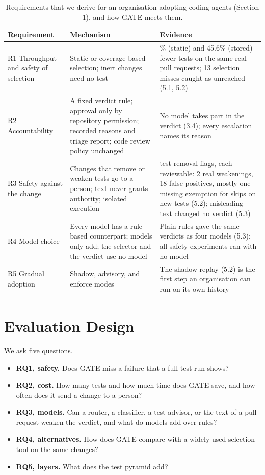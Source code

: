 \documentclass[conference]{IEEEtran}
\providecommand{\tightlist}{\setlength{\itemsep}{0pt}\setlength{\parskip}{0pt}}
\begin{document}
\begin{table}[t]
\caption{Requirements that we derive for an organisation adopting coding agents (Section 1), and how GATE meets them.}
\centering\scriptsize
\begin{tabularx}{\textwidth}{>{\raggedright\arraybackslash}X>{\raggedright\arraybackslash}X>{\raggedright\arraybackslash}X}
\toprule
\textbf{Requirement} & \textbf{Mechanism} & \textbf{Evidence} \\
\midrule
R1 Throughput and safety of selection & Static or coverage-based selection; inert changes need no test & 33.8\% (static) and 45.6\% (stored) fewer tests on the same real pull requests; 13 selection misses caught as unreached (5.1, 5.2) \\
R2 Accountability & A fixed verdict rule; approval only by repository permission; recorded reasons and triage report; code review policy unchanged & No model takes part in the verdict (3.4); every escalation names its reason \\
R3 Safety against the change & Changes that remove or weaken tests go to a person; text never grants authority; isolated execution & 36 test-removal flags, each reviewable: 2 real weakenings, 18 false positives, mostly one missing exemption for skips on new tests (5.2); misleading text changed no verdict (5.3) \\
R4 Model choice & Every model has a rule-based counterpart; models only add; the selector and the verdict use no model & Plain rules gave the same verdicts as four models (5.3); all safety experiments ran with no model \\
R5 Gradual adoption & Shadow, advisory, and enforce modes & The shadow replay (5.2) is the first step an organisation can run on its own history \\
\bottomrule
\end{tabularx}
\end{table}

\section{Evaluation Design}\label{evaluation-design}

We ask five questions.

\begin{itemize}
\tightlist
\item
  \textbf{RQ1, safety.} Does GATE miss a failure that a full test run shows?
\item
  \textbf{RQ2, cost.} How many tests and how much time does GATE save, and how often does it send a change to a person?
\item
  \textbf{RQ3, models.} Can a router, a classifier, a test advisor, or the text of a pull request weaken the verdict, and what do models add over rules?
\item
  \textbf{RQ4, alternatives.} How does GATE compare with a widely used selection tool on the same changes?
\item
  \textbf{RQ5, layers.} What does the test pyramid add?
\end{itemize}
\end{document}
